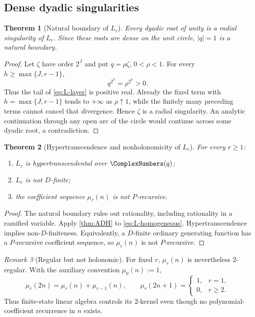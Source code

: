 \documentclass[11pt,oneside]{article}
\newtheorem{theorem}{Theorem}[section]
\theoremstyle{definition}
\theoremstyle{remark}
\newtheorem{remark}[theorem]{Remark}
\begin{document}
\subsection{Dense dyadic singularities}

\begin{theorem}[Natural boundary of $L_r$]\label{thm:L-boundary}
Every dyadic root of unity is a radial singularity of $L_r$.  Since these
roots are dense on the unit circle, $|q|=1$ is a natural boundary.
\end{theorem}

\begin{proof}
Let $\zeta$ have order $2^J$ and put $q=\rho\zeta$, $0<\rho<1$.  For every
$h\geq\max\{J,r-1\}$,
\[
 q^{2^h}=\rho^{2^h}>0.
\]
Thus the tail of \eqref{eq:L-layer} is positive real.  Already the fixed term
with $h=\max\{J,r-1\}$ tends to $+\infty$ as $\rho\uparrow1$, while the
finitely many preceding terms cannot cancel that divergence.  Hence $\zeta$
is a radial singularity.  An analytic continuation through any open arc of
the circle would continue across some dyadic root, a contradiction.
\end{proof}

\begin{theorem}[Hypertranscendence and nonholonomicity of $L_r$]\label{thm:L-hyper}
For every $r\geq1$:
\begin{enumerate}[label=(\roman*)]
\item $L_r$ is hypertranscendental over $\ComplexNumbers(q)$;
\item $L_r$ is not $D$-finite;
\item the coefficient sequence $\mu_r(n)$ is not $P$-recursive.
\end{enumerate}
\end{theorem}

\begin{proof}
The natural boundary rules out rationality, including rationality in a
ramified variable.  Apply \cref{thm:ADH} to \eqref{eq:L-homogeneous}.
Hypertranscendence implies non-$D$-finiteness.  Equivalently, a $D$-finite
ordinary generating function has a $P$-recursive coefficient sequence, so
$\mu_r(n)$ is not $P$-recursive.
\end{proof}

\begin{remark}[Regular but not holonomic]
For fixed $r$, $\mu_r(n)$ is nevertheless $2$-regular.  With the auxiliary
convention $\mu_0(n):=1$,
\begin{equation}\label{eq:mu-2regular}
 \mu_r(2n)=\mu_r(n)+\mu_{r-1}(n),\qquad
 \mu_r(2n+1)=\begin{cases}1,&r=1,\\0,&r\geq2.\end{cases}
\end{equation}
Thus finite-state linear algebra controls its $2$-kernel even though no
polynomial-coefficient recurrence in $n$ exists.
\end{remark}
\end{document}
